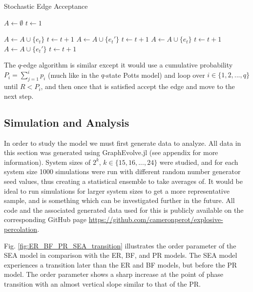 \begin{algorithm}[H]
	\caption{Stochastic Edge Acceptance}\label{Stochastic-Edge-Acceptance}
	\begin{algorithmic}[1]
		\State $A \gets \emptyset$
		\State $t \gets 1$

				\State $A \gets A \cup \{e_t\}$
				\State $t \gets t+1$
				\State $A \gets A \cup \{e_t'\}$
				\State $t \gets t+1$
				\State $A \gets A \cup \{e_t\}$
				\State $t \gets t+1$
			\Else
				\State $A \gets A \cup \{e_t'\}$
				\State $t \gets t+1$
			\EndIf
		\EndWhile
	\EndProcedure
	\end{algorithmic}
\end{algorithm}

The $q$-edge algorithm is similar except it would use a cumulative probability $P_i = \sum\limits_{j=1}^{i} p_i$ (much like in the $q$-state Potts model) and loop over $i \in \{1, 2, ..., q\}$ until $R < P_i$, and then once that is satisfied accept the edge and move to the next step.



\subsection{Simulation and Analysis}
In order to study the model we must first generate data to analyze.
All data in this section was generated using GraphEvolve.jl (see appendix for more information).
System sizes of $2^k$, $k \in \{15, 16, ..., 24\}$ were studied, and for each system size 1000 simulations were run with different random number generator seed values, thus creating a statistical ensemble to take averages of.
It would be ideal to run simulations for larger system sizes to get a more representative sample, and is something which can be investigated further in the future.
All code and the associated generated data used for this is publicly available on the corresponding GitHub page \url{https://github.com/cameronperot/explosive-percolation}.

Fig. \ref{fig:ER_BF_PR_SEA_transition} illustrates the order parameter of the SEA model in comparison with the ER, BF, and PR models.
The SEA model experiences a transition later than the ER and BF models, but before the PR model.
The order parameter shows a sharp increase at the point of phase transition with an almost vertical slope similar to that of the PR.

